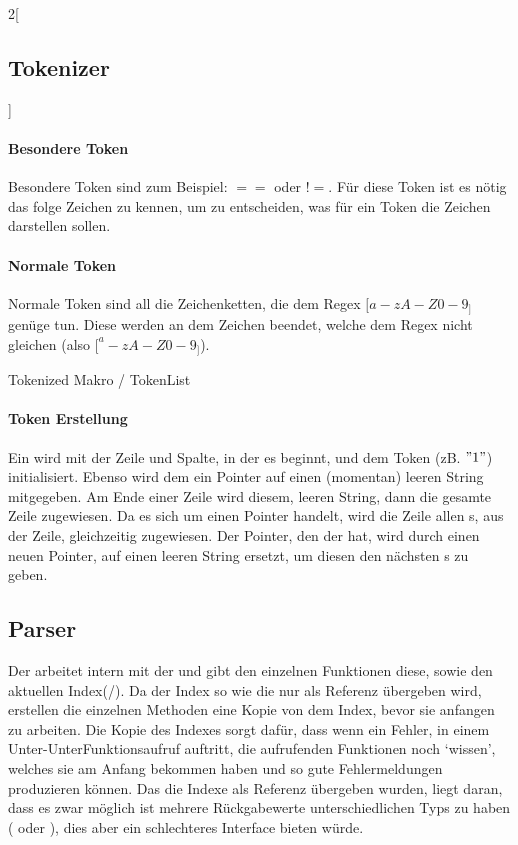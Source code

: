 \begin{paracol}{2}[\subsection{Tokenizer}]
      \paragraph{Besondere Token}
        Besondere Token sind zum Beispiel: \myRIn$==$ oder \myRIn$!=$. Für diese Token ist es nötig das folge Zeichen zu kennen, um zu entscheiden, was für ein Token die Zeichen darstellen sollen.

      \paragraph{Normale Token}
        Normale Token sind all die Zeichenketten, die dem Regex \myRIn$[a-zA-Z0-9_]$ genüge tun. Diese werden an dem Zeichen beendet, welche dem Regex nicht gleichen (also \myRIn$[^a-zA-Z0-9_]$).

    \switchcolumn
      \begin{myCodeEnv}
        \begin{myInvBox}[width=.9\linewidth]
          
        \caption{Tokenized Makro / TokenList}
        \label{fig:extok}
        \end{myInvBox}
      \end{myCodeEnv}
  \end{paracol}

  \paragraph{Token Erstellung}
    Ein  wird mit der Zeile und Spalte, in der es beginnt, und dem Token (zB. \myMIn$"1 "$) initialisiert. Ebenso wird dem  ein Pointer auf einen (momentan) leeren String mitgegeben. Am Ende einer Zeile wird diesem, leeren String, dann die gesamte Zeile zugewiesen. Da es sich um einen Pointer handelt, wird die Zeile allen s, aus der Zeile, gleichzeitig zugewiesen. Der Pointer, den der  hat, wird durch einen neuen Pointer, auf einen leeren String ersetzt, um diesen den nächsten s zu geben.

  \subsection{Parser}
  \label{ssec:Parser}
    Der  arbeitet intern mit der  und gibt den einzelnen Funktionen diese, sowie den aktuellen Index(/). Da der Index so wie die  nur als Referenz übergeben wird, erstellen die einzelnen Methoden eine Kopie von dem Index, bevor sie anfangen zu arbeiten. Die Kopie des Indexes sorgt dafür, dass wenn ein Fehler, in einem Unter-UnterFunktionsaufruf auftritt, die aufrufenden Funktionen noch `wissen', welches  sie am Anfang bekommen haben und so gute Fehlermeldungen produzieren können. Das die Indexe als Referenz übergeben wurden, liegt daran, dass es zwar möglich ist mehrere Rückgabewerte unterschiedlichen Typs zu haben ( oder ), dies aber ein schlechteres Interface bieten würde.

